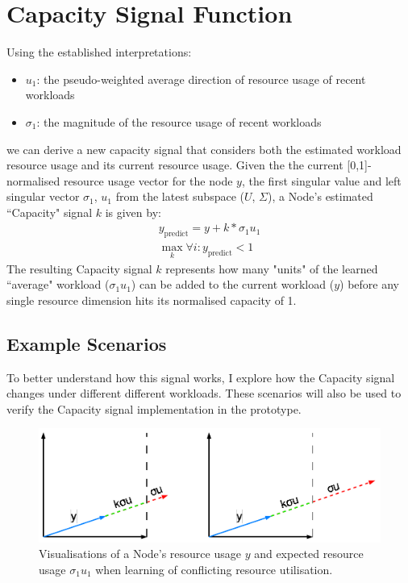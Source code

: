 \section{Capacity Signal Function}
\label{sec:capacity-signal}
Using the established interpretations:
\begin{itemize}
    \item $u_1$: the pseudo-weighted average direction of resource usage of
        recent workloads
    \item $\sigma_1$: the magnitude of the resource usage of recent workloads
\end{itemize}
we can derive a new capacity signal that considers both the estimated
workload resource usage and its current resource usage. Given the the current
[0,1]-normalised resource usage vector for the node $y$, the first singular
value and left singular vector $\sigma_1$, $u_1$ from the latest subspace ($U$,
$\Sigma$), a Node's estimated ``Capacity" signal $k$ is given by:
\begin{align}
    y_{\text{predict}} = y + k * \sigma_1 u_1 \\
    \max_k \forall i: y_{\text{predict}} < 1
\end{align}
The resulting Capacity signal $k$ represents how many "units" of the learned
``average" workload ($\sigma_1 u_1$) can be added to the current workload ($y$)
before any single resource dimension hits its normalised capacity of 1.
%
\subsection{Example Scenarios}
\label{sec:signal-example-scenario}
To better understand how this signal works, I explore how the Capacity signal
changes under different different workloads. These scenarios will also be used to
verify the Capacity signal implementation in the prototype.

\begin{figure}[ht]
    \centering
    \includegraphics[width=\textwidth]{images/conflicting-workload.pdf}
    \caption{Visualisations of a Node's resource usage $y$ and expected resource
    usage $\sigma_1 u_1$ when learning of conflicting resource utilisation.}
    \label{fig:conflicting-workload}
\end{figure}

